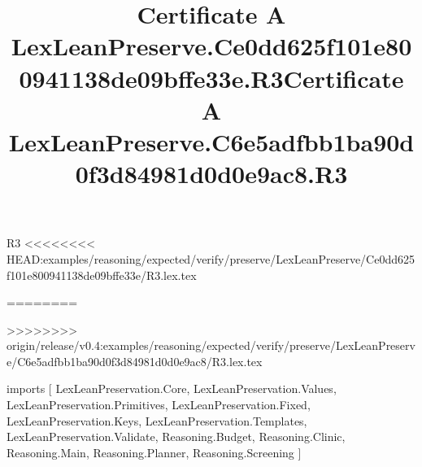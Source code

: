 \begin{lexlean}{R3}
<<<<<<<< HEAD:examples/reasoning/expected/verify/preserve/LexLeanPreserve/Ce0dd625f101e800941138de09bffe33e/R3.lex.tex
\title{Certificate A LexLeanPreserve.Ce0dd625f101e800941138de09bffe33e.R3}
========
\title{Certificate A LexLeanPreserve.C6e5adfbb1ba90d0f3d84981d0d0e9ac8.R3}
>>>>>>>> origin/release/v0.4:examples/reasoning/expected/verify/preserve/LexLeanPreserve/C6e5adfbb1ba90d0f3d84981d0d0e9ac8/R3.lex.tex
\begin{coremodule}
imports [
  LexLeanPreservation.Core,
  LexLeanPreservation.Values,
  LexLeanPreservation.Primitives,
  LexLeanPreservation.Fixed,
  LexLeanPreservation.Keys,
  LexLeanPreservation.Templates,
  LexLeanPreservation.Validate,
  Reasoning.Budget,
  Reasoning.Clinic,
  Reasoning.Main,
  Reasoning.Planner,
  Reasoning.Screening
]


\end{coremodule}
\end{lexlean}
